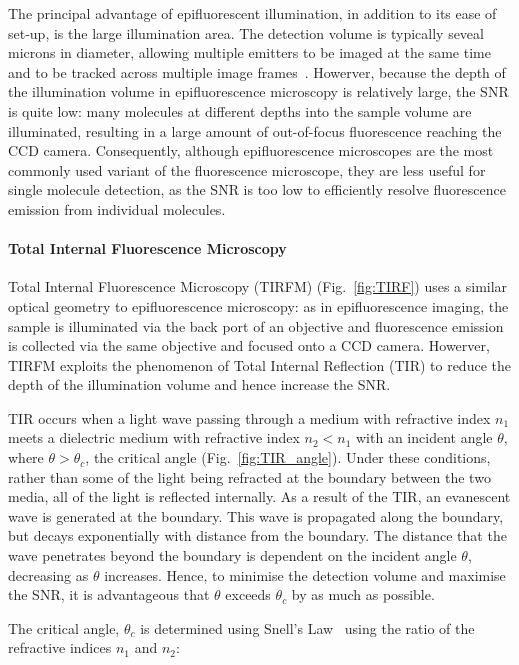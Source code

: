 The principal advantage of epifluorescent illumination, in addition to its ease of set-up, is the large illumination area. The detection volume is typically seveal microns in diameter, allowing multiple emitters to be imaged at the same time and to be tracked across multiple image frames~\cite{???}. Howerver, because the depth of the illumination volume in epifluorescence microscopy is relatively large, the SNR is quite low: many molecules at different depths into the sample volume are illuminated, resulting in a large amount of out-of-focus fluorescence reaching the CCD camera. Consequently, although epifluorescence microscopes are the most commonly used variant of the fluorescence microscope, they are less useful for single molecule detection, as the SNR is too low to efficiently resolve fluorescence emission from individual molecules.

\paragraph{Total Internal Fluorescence Microscopy}
Total Internal Fluorescence Microscopy (TIRFM) (Fig.~\ref{fig:TIRF}) uses a similar optical geometry to epifluorescence microscopy: as in epifluorescence imaging, the sample is illuminated via the back port of an objective and fluorescence emission is collected via the same objective and focused onto a CCD camera. Howerver, TIRFM exploits the phenomenon of Total Internal Reflection (TIR) to reduce the depth of the illumination volume and hence increase the SNR.

TIR occurs when a light wave passing through a medium with refractive index $n_1$ meets a dielectric medium with refractive index $n_2 < n_1$ with an incident angle $\theta$, where $\theta > \theta_c$, the critical angle (Fig.~\ref{fig:TIR_angle}). Under these conditions, rather than some of the light being refracted at the boundary between the two media, all of the light is reflected internally. As a result of the TIR, an evanescent wave is generated at the boundary. This wave is propagated along the boundary, but decays exponentially with distance from the boundary. The distance that the wave penetrates beyond the boundary is dependent on the incident angle $\theta$, decreasing as $\theta$ increases. Hence, to minimise the detection volume and maximise the SNR, it is advantageous that $\theta$ exceeds $\theta_c$ by as much as possible. 

The critical angle, $\theta_c$ is determined using Snell's Law~\cite{???} using the ratio of the refractive indices $n_1$ and $n_2$:

